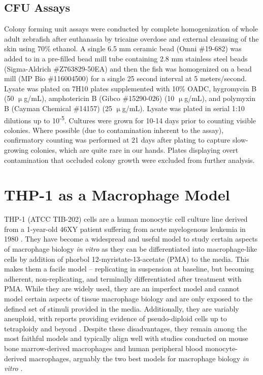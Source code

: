 \subsection{CFU Assays}\label{cfuassay}

Colony forming unit assays were conducted by complete homogenization of whole adult zebrafish after euthanasia by tricaine overdose and external cleansing of the skin using 70\% ethanol. A single 6.5 mm ceramic bead (Omni \#19-682) was added to in a pre-filled bead mill tube containing 2.8 mm stainless steel beads (Sigma-Aldrich \#Z763829-50EA) and then the fish was homogenized on a bead mill (MP Bio \#116004500) for a single 25 second interval at 5 meters/second. Lysate was plated on 7H10 plates supplemented with 10\% OADC,  hygromycin B (50 $\upmu$g/mL), amphotericin B (Gibco \#15290-026) (10 $\upmu$g/mL), and polymyxin B (Cayman Chemical \#14157) (25 $\upmu$g/mL). Lysate was plated in serial 1:10 dilutions up to 10\textsuperscript{-5}. Cultures were grown for 10-14 days prior to counting visible colonies. Where possible (due to contamination inherent to the assay), confirmatory counting was performed at 21 days after plating to capture slow-growing colonies, which are quite rare in our hands. Plates displaying overt contamination that occluded colony growth were excluded from further analysis.

\section{THP-1 as a Macrophage Model}\label{thp1}

THP-1 (ATCC TIB-202) cells are a human monocytic cell culture line derived from a 1-year-old 46XY patient suffering from acute myelogenous leukemia in 1980 \citep{Tsuchiya1980}. They have become a widespread and useful model to study certain aspects of macrophage biology \textit{in vitro} as they can be differentiated into macrophage-like cells by addition of phorbol 12-myristate-13-acetate (PMA) to the media. This makes them a facile model -- replicating in suspension at baseline, but becoming adherent, non-replicating, and terminally differentiated after treatment with PMA. While they are widely used, they are an imperfect model and cannot model certain aspects of tissue macrophage biology and are only exposed to the defined set of stimuli provided in the media. Additionally, they are variably aneuploid, with reports providing evidence of pseudo-diploid cells up to tetraploidy and beyond \citep{Odero2000, Adati2009, Kasai2022}. Despite these disadvantages, they remain among the most faithful models and typically align well with studies conducted on mouse bone marrow-derived macrophages and human peripheral blood monocyte-derived macrophages, arguably the two best models for macrophage biology \textit{in vitro} \citep{MendozaCoronel2016}. 

